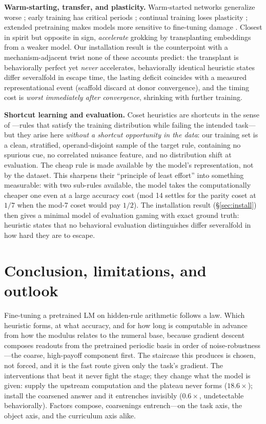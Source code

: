 \documentclass{article} %
\begin{document}
\textbf{Warm-starting, transfer, and plasticity.} Warm-started networks generalize worse \citep{ash2020warm}; early training has critical periods \citep{achille2019critical}; continual training loses plasticity \citep{dohare2024plasticity}; extended pretraining makes models more sensitive to fine-tuning damage \citep{springer2025overtrained}. Closest in spirit but opposite in sign, \citet{xu2025groktransfer} \emph{accelerate} grokking by transplanting embeddings from a weaker model. Our installation result is the counterpoint with a mechanism-adjacent twist none of these accounts predict: the transplant is behaviorally perfect yet \emph{never} accelerates, behaviorally identical heuristic states differ severalfold in escape time, the lasting deficit coincides with a measured representational event (scaffold discard at donor convergence), and the timing cost is \emph{worst immediately after convergence}, shrinking with further training.

\textbf{Shortcut learning and evaluation.} Coset heuristics are shortcuts in the sense of \citet{geirhos2020shortcut}---rules that satisfy the training distribution while failing the intended task---but they arise here \emph{without a shortcut opportunity in the data}: our training set is a clean, stratified, operand-disjoint sample of the target rule, containing no spurious cue, no correlated nuisance feature, and no distribution shift at evaluation. The cheap rule is made available by the model's representation, not by the dataset. This sharpens their ``principle of least effort'' into something measurable: with two sub-rules available, the model takes the computationally cheaper one even at a large accuracy cost (mod 14 settles for the parity coset at $1/7$ when the mod-7 coset would pay $1/2$). The installation result (\S\ref{sec:install}) then gives a minimal model of evaluation gaming with exact ground truth: heuristic states that no behavioral evaluation distinguishes differ severalfold in how hard they are to escape.

\section{Conclusion, limitations, and outlook}
\label{sec:limits}

Fine-tuning a pretrained LM on hidden-rule arithmetic follows a law. Which heuristic forms, at what accuracy, and for how long is computable in advance from how the modulus relates to the numeral base, because gradient descent composes readouts from the pretrained periodic basis in order of noise-robustness---the coarse, high-payoff component first. The staircase this produces is chosen, not forced, and it is the fast route given only the task's gradient. The interventions that beat it never fight the stage; they change what the model is given: supply the upstream computation and the plateau never forms ($18.6\times$); install the coarsened answer and it entrenches invisibly ($0.6\times$, undetectable behaviorally). Factors compose, coarsenings entrench---on the task axis, the object axis, and the curriculum axis alike.
\end{document}
